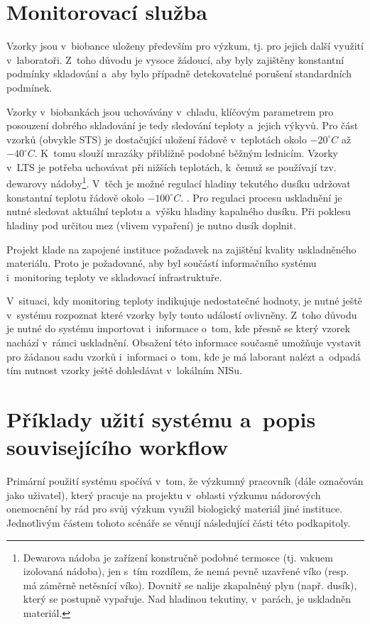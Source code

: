 \section{Monitorovací služba}
Vzorky jsou v~biobance uloženy především pro výzkum, tj. pro jejich další využití v~laboratoři. Z~toho důvodu je vysoce žádoucí, aby byly zajištěny konstantní podmínky skladování a~aby bylo případně detekovatelné porušení standardních podmínek. 

Vzorky v~biobankách jsou uchovávány v~chladu, klíčovým parametrem pro posouzení dobrého skladování je tedy sledování teploty a~jejich výkyvů. Pro část vzorků (obvykle STS) je dostačující uložení řádově v~teplotách okolo $-20^{\circ}C$ až $-40^{\circ}C$. K~tomu slouží mrazáky přibližně podobné běžným lednicím.
Vzorky v~LTS je potřeba uchovávat při nižších teplotách, k~čemuž se používají tzv. dewarovy nádoby\footnote{Dewarova nádoba je zařízení konstručně podobné termosce (tj. vakuem izolovaná nádoba), jen s~tím rozdílem, že nemá pevně uzavřené víko (resp. má záměrně netěsnící víko). Dovnitř se nalije zkapalněný plyn (např. dusík), který se postupně vypařuje. Nad hladinou tekutiny, v~parách, je uskladněn materiál.}. V~těch je možné regulací hladiny tekutého dusíku udržovat konstantní teplotu řádově okolo $-100^{\circ}C$.
. Pro regulaci procesu uskladnění je nutné sledovat aktuální teplotu a~výšku hladiny kapalného dusíku. Při poklesu hladiny pod určitou mez (vlivem vypaření) je nutno dusík doplnit. 

Projekt \ProjectName klade na zapojené instituce požadavek na zajištění kvality uskladněného materiálu. Proto je požadované, aby byl součástí informačního systému i~monitoring teploty ve skladovací infrastruktuře.

V~situaci, kdy monitoring teploty indikujuje nedostatečné hodnoty, je nutné ještě v~systému rozpoznat které vzorky byly touto událostí ovlivněny. Z~toho důvodu je nutné do systému importovat i~informace o~tom, kde přesně se který vzorek nachází v~rámci uskladnění. Obsažení této informace současně umožňuje vystavit pro žádanou sadu vzorků i~informaci o~tom, kde je má laborant nalézt a~odpadá tím nutnost vzorky ještě dohledávat v~lokálním NISu.


\section{Příklady užití systému a~popis souvisejícího workflow}
Primární použití systému spočívá v~tom, že výzkumný pracovník (dále označován jako uživatel), který pracuje na projektu v~oblasti výzkumu nádorových onemocnění by rád pro svůj výzkum využil biologický materiál jiné instituce. Jednotlivým částem tohoto scénáře se věnují následující části této podkapitoly.

